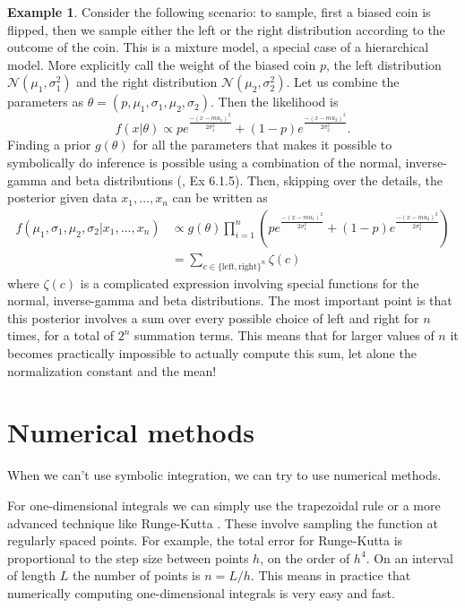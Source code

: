 \documentclass[12pt,vu]{adammath}
\theoremstyle{plain}
\theoremstyle{definition}
\newtheorem{example}[theorem]{Example}
\theoremstyle{remark}
\begin{document}
\begin{mybox}
\begin{example}\label{mixtureexample}
Consider the following scenario: to sample, first a biased coin is flipped, then we sample either the left or the right distribution according to the outcome of the coin.
This is a mixture model, a special case of a hierarchical model.
More explicitly call the weight of the biased coin $p$, the left distribution $\mathcal{N}(\mu_1, \sigma_1^2)$ and the right distribution $\mathcal{N}(\mu_2, \sigma_2^2)$.
Let us combine the parameters as $\theta = (p, \mu_1, \sigma_1, \mu_2, \sigma_2)$.
Then the likelihood is $$f(x | \theta) \propto p e^{\frac{-(x-mu_1)^2}{2\sigma_1^2}} + (1-p)e^{\frac{-(x-mu_2)^2}{2\sigma_2^2}}.$$
Finding a prior $g(\theta)$ for all the parameters that makes it possible to symbolically do inference is possible using a combination of the normal, inverse-gamma and beta distributions (\cite{bayesianchoice}, Ex 6.1.5).
Then, skipping over the details, the posterior given data $x_1, ..., x_n$ can be written as
\begin{align*}
  f(\mu_1, \sigma_1, \mu_2, \sigma_2 | x_1, ..., x_n) &\propto g(\theta) \prod_{i=1}^n \left( p e^{\frac{-(x-mu_1)^2}{2\sigma_1^2}} + (1-p)e^{\frac{-(x-mu_2)^2}{2\sigma_2^2}} \right) \\
  &= \sum_{c \in \{\text{left}, \text{right}\}^n} \zeta(c)
\end{align*}
where $\zeta(c)$ is a complicated expression involving special functions for the normal, inverse-gamma and beta distributions.
The most important point is that this posterior involves a sum over every possible choice of left and right for $n$ times, for a total of $2^n$ summation terms.
This means that for larger values of $n$ it becomes practically impossible to actually compute this sum, let alone the normalization constant and the mean!
\end{example}
\end{mybox}

\section{Numerical methods}
When we can't use symbolic integration, we can try to use numerical methods.

For one-dimensional integrals we can simply use the trapezoidal rule or a more advanced technique like Runge-Kutta \cite{rungekutta}.
These involve sampling the function at regularly spaced points.
For example, the total error for Runge-Kutta is proportional to the step size between points $h$, on the order of $h^4$.
On an interval of length $L$ the number of points is $n = L / h$.
This means in practice that numerically computing one-dimensional integrals is very easy and fast.
\end{document}
